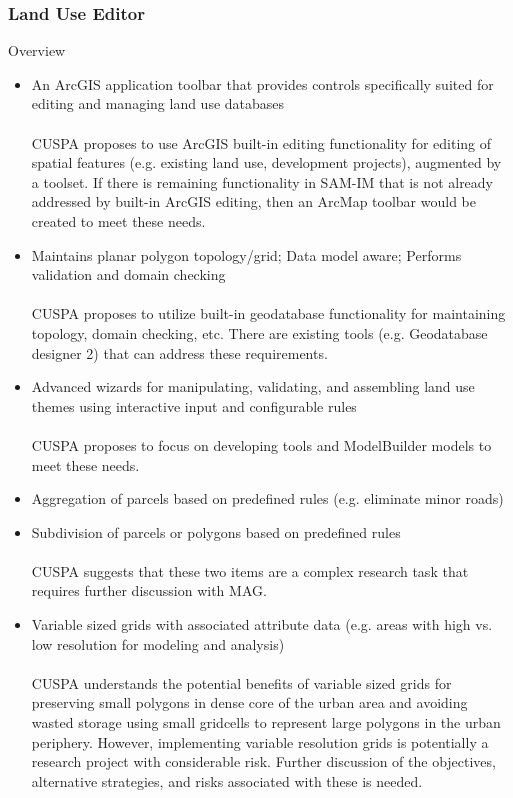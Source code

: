 \documentclass[titlepage]{article}
\begin{document}
\subsubsection{Land Use Editor}
Overview
\begin{itemize}
	\item An ArcGIS application toolbar that provides controls specifically suited for editing and managing land use databases
	\\\\
	CUSPA proposes to use ArcGIS built-in editing functionality for editing of spatial features (e.g. existing land use, development projects), augmented by a toolset.  If there is remaining functionality in SAM-IM that is not already addressed by built-in ArcGIS editing, then an ArcMap toolbar would be created to meet these needs.
	\item Maintains planar polygon topology/grid; Data model aware; Performs validation and domain checking
	\\\\
	CUSPA proposes to utilize built-in geodatabase functionality for maintaining topology, domain checking, etc.  There are existing tools (e.g. Geodatabase designer 2) that can address these requirements.
	\item Advanced wizards for manipulating, validating, and assembling land use themes using interactive input and configurable rules
	\\\\
	CUSPA proposes to focus on developing tools and ModelBuilder models to meet these needs.
	\item Aggregation of parcels based on predefined rules (e.g. eliminate minor roads)
	\item Subdivision of parcels or polygons based on predefined rules
	\\\\
	CUSPA suggests that these two items are a complex research task that requires further discussion with MAG.
	\item Variable sized grids with associated attribute data (e.g. areas with high vs. low resolution for modeling and analysis)
	\\\\
	CUSPA understands the potential benefits of variable sized grids for preserving small polygons in dense core of the urban area and avoiding wasted storage using small gridcells to represent large polygons in the urban periphery.  However, implementing variable resolution grids is potentially a research project with considerable risk.  Further discussion of the objectives, alternative strategies, and risks associated with these is needed.

\end{itemize}
\end{document}

